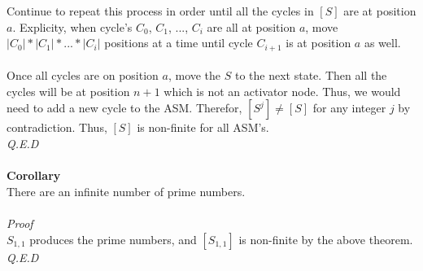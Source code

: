 \documentclass[a4paper,12pt]{article}
\begin{document}
Continue to repeat this process in order until all the cycles in $[S]$ are at position $a$. Explicity, when cycle's $C_0$, $C_1$, ..., $C_i$ are all at position $a$, move $|C_0|*|C_1|*...*|C_i|$ positions at a time until cycle $C_{i+1}$ is at position $a$ as well.\\
\\
Once all cycles are on position $a$, move the $S$ to the next state. Then all the cycles will be at position $n + 1$ which is not an activator node. Thus, we would need to add a new cycle to the ASM. Therefor, $[S^j] \neq [S]$ for any integer $j$ by contradiction. Thus, $[S]$ is non-finite for all ASM's.\\
\textit{Q.E.D}\\     
\\
\textbf{Corollary}\\
There are an infinite number of prime numbers.\\
\\
\textit{Proof}\\ 
$S_{1,1}$ produces the prime numbers, and $[S_{1,1}]$ is non-finite by the above theorem.\\
\textit{Q.E.D}\\
\end{document}
